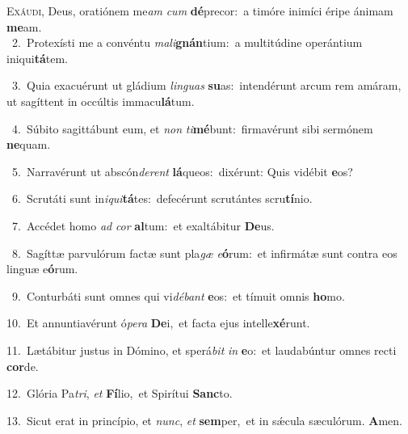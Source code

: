 \lettrine{\initial\textcolor{\initialcolor}{E}}{xáudi,} Deus, oratiónem me\textit{am} \textit{cum} \textbf{dé}\-precor:~\star a timóre inimíci éripe ánimam \textbf{me}\-am.\\
{\numbfont\textcolor{\numbcolor}{~2.}}~Protexísti me a convéntu \textit{ma}\-\textit{li}\textbf{gnán}tium:~\star a multitúdine operántium iniqui\-\textbf{tá}\-tem.\par
{\numbfont\textcolor{\numbcolor}{~3.}}~Quia exacuérunt ut gládium \textit{lin}\-\textit{guas} \textbf{su}\-as:~\star intendérunt arcum rem amáram, ut sagíttent in occúltis immacu\-\textbf{lá}\-tum.\par
{\numbfont\textcolor{\numbcolor}{~4.}}~Súbito sagittábunt eum, et \textit{non} \textit{ti}\-\textbf{mé}bunt:~\star firmavérunt sibi sermónem \textbf{ne}\-quam.\par
{\numbfont\textcolor{\numbcolor}{~5.}}~Narravérunt ut abscón\-\textit{de}\-\textit{rent} \textbf{lá}\-queos:~\star dixérunt: Quis vidébit \textbf{e}\-os?\par
{\numbfont\textcolor{\numbcolor}{~6.}}~Scrutáti sunt in\-\textit{i}\-\textit{qui}\textbf{tá}tes:~\star defecérunt scrutántes scru\-\textbf{tí}\-nio.\par
{\numbfont\textcolor{\numbcolor}{~7.}}~Accédet homo \textit{ad} \textit{cor} \textbf{al}\-tum:~\star et exaltábitur \textbf{De}\-us.\par
{\numbfont\textcolor{\numbcolor}{~8.}}~Sagíttæ parvulórum factæ sunt pla\textit{gæ} \textit{e}\-\textbf{ó}rum:~\star et infirmátæ sunt contra eos linguæ e\-\textbf{ó}\-rum.\par
{\numbfont\textcolor{\numbcolor}{~9.}}~Conturbáti sunt omnes qui vi\-\textit{dé}\-\textit{bant} \textbf{e}\-os:~\star et tímuit omnis \textbf{ho}\-mo.\par
{\numbfont\textcolor{\numbcolor}{10.}}~Et annuntiavérunt ó\-\textit{pe}\-\textit{ra} \textbf{De}\-i,~\star et facta ejus intelle\-\textbf{xé}\-runt.\par
{\numbfont\textcolor{\numbcolor}{11.}}~Lætábitur justus in Dómino, et sperá\textit{bit} \textit{in} \textbf{e}\-o:~\star et laudabúntur omnes recti \textbf{cor}\-de.\par
{\numbfont\textcolor{\numbcolor}{12.}}~Glória Pa\-\textit{tri}\-, \textit{et} \textbf{Fí}\-lio,~\star et Spirítui \textbf{Sanc}\-to.\par
{\numbfont\textcolor{\numbcolor}{13.}}~Sicut erat in princípio, et \textit{nunc}\-, \textit{et} \textbf{sem}\-per,~\star et in sǽcula sæculórum. \textbf{A}\-men.\par

